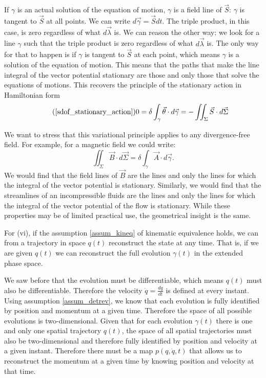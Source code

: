 \documentclass[10pt,twocolumn, nofootinbib]{revtex4-2}
\begin{document}
If $\gamma$ is an actual solution of the equation of motion, $\gamma$ is a field line of $\vec{S}$: $\gamma$ is tangent to $\vec{S}$ at all points. We can write $d\vec{\gamma} = \vec{S} dt$. The triple product, in this case, is zero regardless of what $d\vec{\lambda}$ is. We can reason the other way: we look for a line $\gamma$ such that the triple product is zero regardless of what $d\vec{\lambda}$ is. The only way for that to happen is if $\gamma$ is tangent to $\vec{S}$ at each point, which means $\gamma$ is a solution of the equation of motion. This means that the paths that make the line integral of the vector potential stationary are those and only those that solve the equations of motions. This recovers the principle of the stationary action in Hamiltonian form
\begin{equation}
\tag*{(\ref{sdof_stationary_action})}
	0 =\delta \int_{\gamma} \vec{\theta} \cdot d\vec{\gamma} = - \iint_{\Sigma} \vec{S} \cdot d\vec{\Sigma} 
\end{equation}

We want to stress that this variational principle applies to any divergence-free field. For example, for a magnetic field we could write:
\begin{equation}
	\iint_{\Sigma} \vec{B} \cdot d\vec{\Sigma} = \delta \int_{\gamma} \vec{A} \cdot d\vec{\gamma}.
\end{equation}
We would find that the field lines of $\vec{B}$ are the lines and only the lines for which the integral of the vector potential is stationary. Similarly, we would find that the streamlines of an incompressible fluids are the lines and only the lines for which the integral of the vector potential of the flow is stationary. While these properties may be of limited practical use, the geometrical insight is the same.

For (vi), if the assumption \ref{assum_kineq} of kinematic equivalence  holds, we can from a trajectory in space $q(t)$ reconstruct the state at any time. That is, if we are given $q(t)$ we can reconstruct the full evolution $\gamma(t)$ in the extended phase space.

We saw before that the evolution must be differentiable, which means $q(t)$ must also be differentiable. Therefore the velocity $\dot{q} = \frac{dq}{dt}$ is defined at every instant. Using assumption \ref{assum_detrev}, we know that each evolution is fully identified by position and momentum at a given time. Therefore the space of all possible evolutions is two-dimensional. Given that for each evolution $\gamma(t)$ there is one and only one spatial trajectory $q(t)$, the space of all spatial trajectories must also be two-dimensional and therefore fully identified by position and velocity at a given instant. Therefore there must be a map $p(q, \dot{q}, t)$ that allows us to reconstruct the momentum at a given time by knowing position and velocity at that time.
\end{document}

